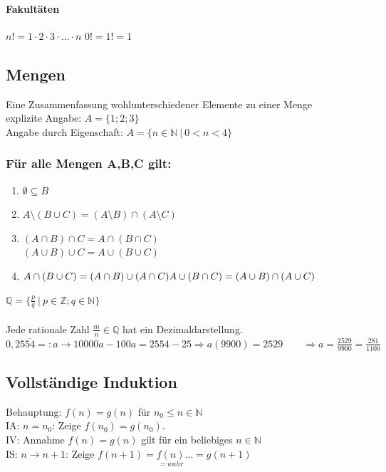 \documentclass[6pt,a4paper]{scrartcl}
\begin{document}
\begin{multicols*}{4}
\paragraph{Fakultäten} %
\label{par:fakultaeten}
$n! = 1 \cdot 2 \cdot 3 \cdot \ldots \cdot n$ \qquad  $0! = 1! = 1$



\subsection{Mengen}

Eine Zusammenfassung wohlunterschiedener Elemente zu einer Menge\\
explizite Angabe: $A=\{1;2;3\}$\\
Angabe durch Eigenschaft: $A=\{n\in\mathbb N\ \vert\ 0<n<4\}$
\subsubsection{Für alle Mengen A,B,C gilt:}
\begin{enumerate}\itemsep-1pt
\item $\emptyset \subseteq B $
\item $A \setminus (B \cup C) = (A \setminus B) \cap (A \setminus C)$
\item $(A \cap B) \cap C = A \cap (B \cap C)$\\
	$(A \cup B) \cup C = A \cup (B \cup C)$
\item $A \cap (B \cup C) = (A \cap B) \cup (A \cap C) \\
	A \cup (B \cap C) = (A \cup B) \cap (A \cup C)$
\end{enumerate}


$\mathbb Q=\{\frac{p}{q}\ \vert\ p\in\mathbb Z; q\in\mathbb N\}$\\
\\
Jede rationale Zahl $\frac m n \in \mathbb Q$ hat ein Dezimaldarstellung.\\
$0,25\overline{54} =: a \rightarrow 10000a - 100a = 2554 -25 \Rightarrow a(9900) = 2529 \qquad \Rightarrow a = \frac{2529}{9900} = \frac{281}{1100}$

\subsection{Vollständige Induktion}
Behauptung: $f(n)=g(n)$ für $n_0 \le n \in \mathbb N$\\
IA: $n=n_0$: \quad Zeige $f(n_0)=g(n_0)$.\\
IV: Annahme $f(n)=g(n)$ gilt für ein beliebiges $n\in\mathbb N$\\
IS: $n \rightarrow n+1$: \quad Zeige $f(n+1)=\underset{=wahr}{f(n)}  \dotsc=g(n+1)$


\end{multicols*}
\end{document}
